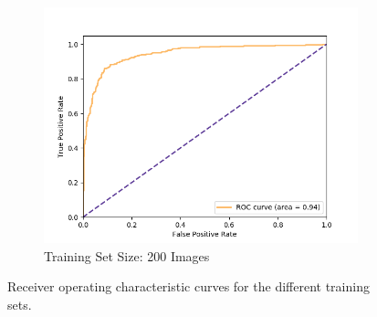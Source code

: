 \begin{figure}[!h]
\begin{subfigure}{.48\textwidth}
        \includegraphics[width=\textwidth]{images/score-100-roc.png}
        \caption{Training Set Size: 200 Images}
    \end{subfigure}
  
  \caption{Receiver operating characteristic curves for the different training sets.}
  \label{fig:roc}
\end{figure}







